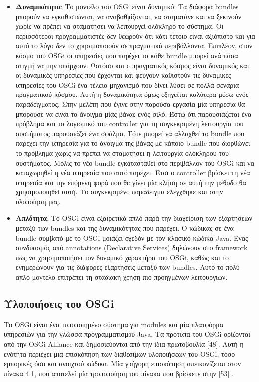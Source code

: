 \begin{itemize}
	\item{\textbf{Δυναμικότητα}: Το μοντέλο του OSGi είναι δυναμικό. Τα διάφορα bundles μπορούν να εγκαθιστώνται, να αναβαθμίζονται, να σταματάνε και να ξεκινούν χωρίς να πρέπει να σταματήσει να λειτουργεί ολόκληρο το σύστημα. Οι περισσότεροι προγραμματιστές δεν θεωρούν ότι κάτι τέτοιο είναι αξιόπιστο και για αυτό το λόγο δεν το χρησιμοποιούν σε πραγματικά περιβάλλοντα. Επιπλέον, στον κόσμο του OSGi οι υπηρεσίες που παρέχει το κάθε bundle μπορεί ανά πάσα στιγμή να μην υπάρχουν. Ωστόσο και ο πραγματικός κόσμος είναι δυναμικός και οι δυναμικές υπηρεσίες που έρχονται και φεύγουν καθιστούν τις δυναμικές υπηρεσίες του OSGi ένα τέλειο μηχανισμό που δίνει λύσει σε πολλά σενάρια πραγματικού κόσμου. Αυτή η δυναμικότητα όμως εξηγείται καλύτερα μέσω ενός παραδείγματος. Στην μελέτη που έγινε στην παρούσα εργασία μία υπηρεσία θα μπορούσε να είναι το άνοιγμα μίας βάνας ενός σιλό. Έστω ότι παρουσιάζεται ένα πρόβλημα και το λογισμικό του controller για τη συγκεκριμένη λειτουργία του συστήματος παρουσιάζει ένα σφάλμα. Τότε μπορεί να αλλαχθεί το bundle που παρέχει την υπηρεσία για το άνοιγμα της βάνας με κάποιο bundle που διορθώνει το πρόβλημα χωρίς να πρέπει να σταματήσει η λειτουργία ολόκληρου του συστήματος. Μόλις το νέο bundle εγκατασταθεί στο περιβάλλον του OSGi και να καταχωρηθεί η νέα υπηρεσία που αυτό παρέχει. Έτσι ο controller βρίσκει τη νέα υπηρεσία και την επόμενη φορά που θα γίνει μία κλήση σε αυτή την μέθοδο θα χρησιμοποιηθεί αυτή. Το συγκεκριμένο παράδειγμα ελέγχθηκε και στην υλοποίηση μας. }
	\item{\textbf{Απλότητα}: Το OSGi είναι εξαιρετικά απλό παρά την διαχείριση των εξαρτήσεων μεταξύ των bundles και της δυναμικότητας που παρέχει. Ο κώδικας σε ένα bundle συμβατό με το OSGi μοιάζει σχεδόν με τον κλασικό κώδικα Java. Ένας συνδυασμός από annotations (Declarative Services) δηλώνουν στο framework πως να χρησιμοποιήσει τον δυναμικό χαρακτήρα του OSGi, καθώς και το ενημερώνουν για τις διάφορες εξαρτήσεις μεταξύ των bundles. Αυτό το πολύ απλό μοντέλο επιτρέπει τη σταδιακή χρήση πιο προηγμένων λειτουργιών. }
\end{itemize}


\subsection{Υλοποιήσεις του OSGi}

Το OSGi είναι ένα τυποποιημένο σύστημα για modules και μία πλατφόρμα υπηρεσιών για την γλώσσα προγραμματισμού Java. Τα πρότυπα του OSGi ορίζονται από την OSGi Alliance και δημοσιεύονται από την ίδια πρωτοβουλία [48]. Αυτή η ενότητα περιέχει μια επισκόπηση των διαθέσιμων υλοποιήσεων του OSGi, τόσο εμπορικές όσο και ανοιχτού κώδικα. Μία γρήγορη επισκόπηση απεικονίζεται στον πίνακα 4.1, που αποτελεί μία τροποποίηση του πίνακα που βρίσκετε στην [53] . 

